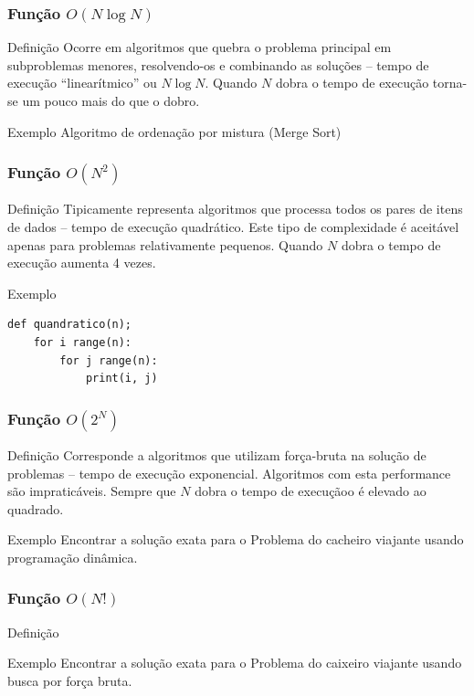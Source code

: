 \documentclass{beamer}
\begin{document}
\begin{frame}[fragile]
\frametitle{Função $O(N \log N)$}

\begin{block}{Definição}
Ocorre em algoritmos que quebra o problema principal em subproblemas menores, resolvendo-os e combinando as soluções -- tempo de execução ``linearítmico'' ou $N \log N$. Quando $N$ dobra o tempo de execução torna-se um pouco mais do que o dobro.
\end{block}\vfill

\begin{exampleblock}{Exemplo}
Algoritmo de ordenação por mistura (Merge Sort)
\end{exampleblock}
\end{frame}

\begin{frame}[fragile]
\frametitle{Função $O(N^{2})$}

\begin{block}{Definição}
Tipicamente representa algoritmos que processa todos os pares de itens de dados -- tempo de execução quadrático. Este tipo de complexidade é aceitável apenas para problemas relativamente pequenos. Quando $N$ dobra o tempo de execução aumenta 4 vezes.
\end{block}\vfill

\begin{exampleblock}{Exemplo}
\begin{lstlisting}
def quandratico(n);
    for i range(n):
        for j range(n):
            print(i, j)
\end{lstlisting}	
\end{exampleblock}
\end{frame}

\begin{frame}[fragile]
\frametitle{Função $O(2^{N})$}

\begin{block}{Definição}
Corresponde a algoritmos que utilizam força-bruta na solução de problemas -- tempo de execução exponencial. Algoritmos com esta performance são impraticáveis. Sempre que $N$ dobra o tempo de execuçãoo é elevado ao quadrado.
\end{block}\vfill

\begin{exampleblock}{Exemplo}
Encontrar a solução exata para o Problema do cacheiro viajante usando programação dinâmica.
\end{exampleblock}
\end{frame}

\begin{frame}[fragile]
\frametitle{Função $O(N!)$}

\begin{block}{Definição}
	
\end{block}\vfill

\begin{exampleblock}{Exemplo}
Encontrar a solução exata para o Problema do caixeiro viajante usando busca por força bruta.
\end{exampleblock}
\end{frame}
\end{document}
